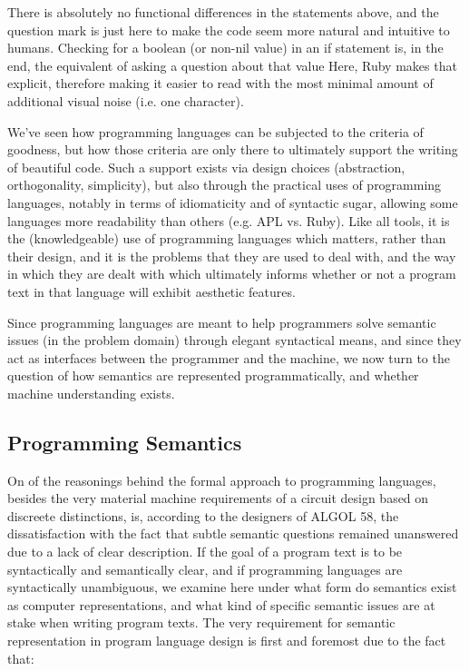 There is absolutely no functional differences in the statements above, and the question mark is just here to make the code seem more natural and intuitive to humans. Checking for a boolean (or non-nil value) in an if statement is, in the end, the equivalent of asking a question about that value Here, Ruby makes that explicit, therefore making it easier to read with the most minimal amount of additional visual noise (i.e. one character).

We've seen how programming languages can be subjected to the criteria of goodness, but how those criteria are only there to ultimately support the writing of beautiful code. Such a support exists via design choices (abstraction, orthogonality, simplicity), but also through the practical uses of programming languages, notably in terms of idiomaticity and of syntactic sugar, allowing some languages more readability than others (e.g. APL vs. Ruby). Like all tools, it is the (knowledgeable) use of programming languages which matters, rather than their design, and it is the problems that they are used to deal with, and the way in which they are dealt with which ultimately informs whether or not a program text in that language will exhibit aesthetic features.

Since programming languages are meant to help programmers solve semantic issues (in the problem domain) through elegant syntactical means, and since they act as interfaces between the programmer and the machine, we now turn to the question of how semantics are represented programmatically, and whether machine understanding exists.

\subsection{Programming Semantics}
\label{subsec:programming-semantics}

On of the reasonings behind the formal approach to programming languages, besides the very material machine requirements of a circuit design based on discreete distinctions, is, according to the designers of ALGOL 58, the dissatisfaction with the fact that subtle semantic questions remained unanswered due to a lack of clear description\citep{sethi_programming_1996}. If the goal of a program text is to be syntactically and semantically clear, and if programming languages are syntactically unambiguous, we examine here under what form do semantics exist as computer representations, and what kind of specific semantic issues are at stake when writing program texts. The very requirement for semantic representation in program language design is first and foremost due to the fact that:

